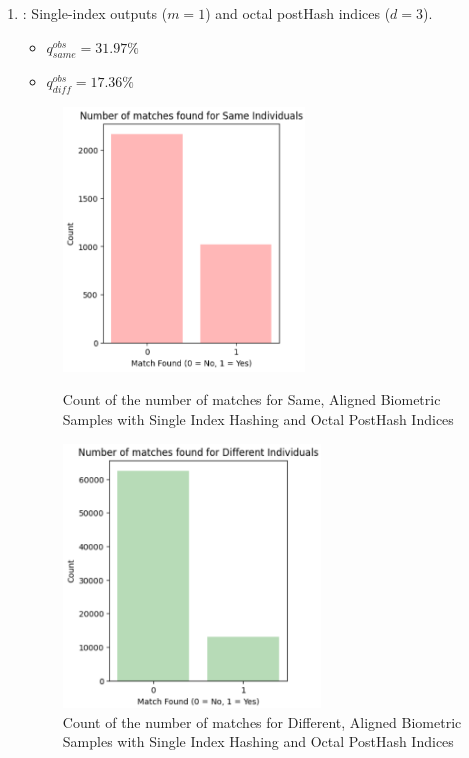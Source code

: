 \begin{enumerate}
    \item {}: Single-index outputs (\(m=1\)) and octal postHash indices (\(d=3\)).
    \begin{itemize}
        \item \(q_{same}^{obs} = 31.97\%\)
        \item \(q_{diff}^{obs} = 17.36\%\)
    \end{itemize}

    \begin{figure}[H]
        \centering
        \begin{minipage}[b]{0.48\linewidth}
            \centering
            \includegraphics[width=\linewidth,height=7cm,keepaspectratio]{latex-img/d3same.png}
            \caption{Count of the number of matches for Same, Aligned Biometric Samples with Single Index Hashing and Octal PostHash Indices}
            \label{mu_same}
        \end{minipage}
        \hfill
        \begin{minipage}[b]{0.48\linewidth}
            \centering
            \includegraphics[width=\linewidth,height=7cm,keepaspectratio]{latex-img/d3diff.png}
            \caption{Count of the number of matches for Different, Aligned Biometric Samples with Single Index Hashing and Octal PostHash Indices}
            \label{mu_diff}
        \end{minipage}
    \end{figure}
    

\end{enumerate}
